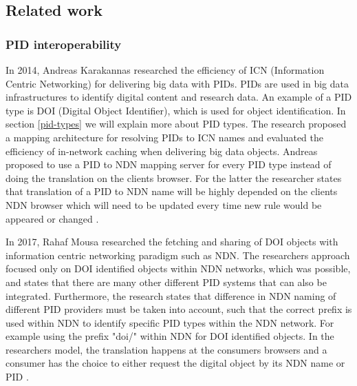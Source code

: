 \subsection{Related work}

\subsubsection{PID interoperability}
In 2014, Andreas Karakannas researched the efficiency of ICN (Information Centric Networking) for delivering big data with PIDs. PIDs are used in big data infrastructures to identify digital content and research data. An example of a PID type is DOI (Digital Object Identifier), which is used for object identification. In section \ref{pid-types} we will explain more about PID types. The research proposed a mapping architecture for resolving PIDs to ICN names and evaluated the efficiency of in-network caching when delivering big data objects. Andreas proposed to use a PID to NDN mapping server for every PID type instead of doing the translation on the clients browser. For the latter the researcher states that translation of a PID to NDN name will  be  highly  depended  on  the  clients  NDN browser  which  will  need  to  be  updated  every  time  new  rule  would  be  appeared  or changed \cite{icn-bd}.

In 2017, Rahaf Mousa researched the fetching and sharing of DOI objects with information centric networking paradigm such as NDN. 
The researchers approach focused only on DOI identified objects within NDN networks, which was possible, and states that there are many other different PID systems that can also be integrated. Furthermore, the research states that difference in NDN naming of different PID providers must be taken into account, such that the correct prefix is used within NDN to identify specific PID types within the NDN network. For example using the prefix "doi/" within NDN for DOI identified objects. 
In the researchers model, the translation happens at the consumers browsers and a consumer has the choice to either request the digital object by its NDN name or PID \cite{ndn-app-aware}.


